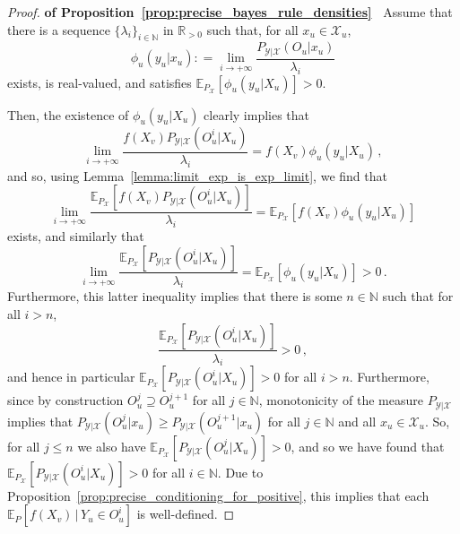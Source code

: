\documentclass[3p]{elsarticle}
\newcommand{\nats}{\mathbb{N}}
\newcommand{\reals}{\mathbb{R}}
\newcommand{\realspos}{\reals_{>0}}
\newcommand{\states}{\mathcal{X}}
\newcommand{\observs}{\mathcal{Y}}
\newcommand{\coloneqq}{:\!=}
\begin{document}
\begin{proof}{\bf of Proposition~\ref{prop:precise_bayes_rule_densities}~}
Assume that there is a sequence $\{\lambda_i\}_{i\in\nats}$ in $\realspos$ such that, for all $x_u\in\states_u$,
\begin{equation*}
\phi_u(y_u\vert x_u) \coloneqq \lim_{i\to+\infty}\frac{P_{\observs\vert\states}(O_u\vert x_u)}{\lambda_i}
\end{equation*}
exists, is real-valued, and satisfies $\mathbb{E}_{P_\states}[\phi_u(y_u\vert X_u)]>0$. 

Then, the existence of $\phi_u(y_u\vert X_u)$ clearly implies that
\begin{equation*}
\lim_{i\to+\infty} \frac{f(X_v)P_{\observs\vert\states}(O_u^i\vert X_u)}{\lambda_i} = f(X_v)\phi_u(y_u\vert X_u)\,,
\end{equation*}
and so, using Lemma~\ref{lemma:limit_exp_is_exp_limit}, we find that
\begin{equation*}
\lim_{i\to+\infty}\frac{\mathbb{E}_{P_\states}[f(X_v)P_{\observs\vert\states}(O_u^i\vert X_u)]}{\lambda_i} = \mathbb{E}_{P_\states}[f(X_v)\phi_u(y_u\vert X_u)]
\end{equation*}
exists, and similarly that
\begin{equation*}
\lim_{i\to+\infty}\frac{\mathbb{E}_{P_\states}[P_{\observs\vert\states}(O_u^i\vert X_u)]}{\lambda_i} = \mathbb{E}_{P_\states}[\phi_u(y_u\vert X_u)] > 0\,.
\end{equation*}
Furthermore, this latter inequality implies that there is some $n\in\nats$ such that for all $i>n$,
\begin{equation*}
\frac{\mathbb{E}_{P_\states}[P_{\observs\vert\states}(O_u^i\vert X_u)]}{\lambda_i} > 0\,,
\end{equation*}
and hence in particular $\mathbb{E}_{P_\states}[P_{\observs\vert\states}(O_u^i\vert X_u)]>0$ for all $i>n$. Furthermore, since by construction $O_u^j\supseteq O_u^{j+1}$ for all $j\in\nats$, monotonicity of the measure $P_{\observs\vert\states}$ implies that $P_{\observs\vert\states}(O_u^j\vert x_u) \geq P_{\observs\vert\states}(O_u^{j+1}\vert x_u)$ for all $j\in\nats$ and all $x_u\in\states_u$. So, for all $j\leq n$ we also have $\mathbb{E}_{P_\states}[P_{\observs\vert\states}(O_u^j\vert X_u)]>0$, and so we have found that $\mathbb{E}_{P_\states}[P_{\observs\vert\states}(O_u^i\vert X_u)]>0$ for all $i\in\nats$. Due to Proposition~\ref{prop:precise_conditioning_for_positive}, this implies that each $\mathbb{E}_P[f(X_v)\,\vert\,Y_u\in O_u^i]$ is well-defined.


\end{proof}
\end{document}
